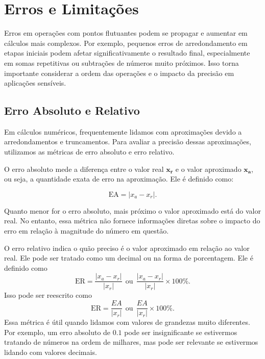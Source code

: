 
\section{Erros e Limitações}\label{subsec:erroselim}

Erros em operações com pontos flutuantes podem se propagar e aumentar em
cálculos mais complexos. Por exemplo, pequenos erros de arredondamento em
etapas iniciais podem afetar significativamente o resultado final,
especialmente em somas repetitivas ou subtrações de números muito próximos.
Isso torna importante considerar a ordem das operações e o impacto da precisão
em aplicações sensíveis.

\subsection{Erro Absoluto e Relativo}

Em cálculos numéricos, frequentemente lidamos com aproximações devido a
arredondamentos e truncamentos. Para avaliar a precisão dessas aproximações,
utilizamos as métricas de erro absoluto e erro relativo.

O erro absoluto mede a diferença entre o valor real \(\boldsymbol{x_r}\) e o
valor aproximado \(\boldsymbol{x_a}\), ou seja, a quantidade exata de erro na
aproximação. Ele é definido como:

\begin{equation}
  \text{EA} = |x_a - x_r|.
\end{equation}

Quanto menor for o erro absoluto, mais próximo o valor aproximado está do valor
real. No entanto, essa métrica não fornece informações diretas sobre o impacto
do erro em relação à magnitude do número em questão.

O erro relativo indica o quão preciso é o valor aproximado em relação ao valor
real. Ele pode ser tratado como um decimal ou na forma de porcentagem. Ele é
definido como
\begin{equation}
  \text{ER} = \frac{|x_a - x_r|}{|x_r|}\ \ \textrm{ou}\ \ \frac{|x_a - x_r|}{|x_r|}\times 100\%.
\end{equation}
Isso pode ser reescrito como
\begin{equation}
  \text{ER} = \frac{{EA}}{|x_r|}\ \ \textrm{ou}\ \ \frac{{EA}}{|x_r|}\times 100\%.
\end{equation}
Essa métrica é útil quando lidamos com valores de grandezas muito diferentes. Por exemplo, um erro absoluto de \( 0.1 \) pode ser insignificante se estivermos tratando de números na ordem de milhares, mas pode ser relevante se estivermos lidando com valores decimais.

